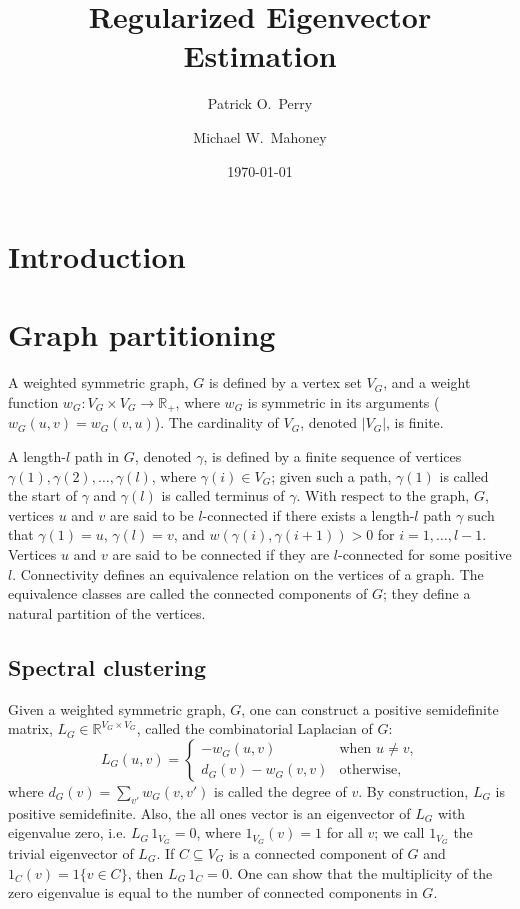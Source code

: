 \documentclass[12pt]{article}
\newcommand{\reals}{\mathbb{R}}
\theoremstyle{plain}
\begin{document}
\title{
  Regularized Eigenvector Estimation
}
\author{
  Patrick O.\ Perry
  \and
  Michael W.\ Mahoney
}
\date{
  \today
}
\maketitle

\begin{abstract}
\end{abstract}

\section{Introduction}

\section{Graph partitioning}
\label{S:introduction}

A weighted symmetric graph, $G$ is defined by a vertex set $V_G$, and a
weight function $w_G : V_G \times V_G \to \reals_+$, where $w_G$ is symmetric
in its arguments ($w_G(u,v) = w_G(v,u)$).  The cardinality of $V_G$,
denoted $|V_G|$, is finite.

A length-$l$ path in $G$, denoted $\gamma$, is defined by a finite sequence of
vertices $\gamma(1), \gamma(2), \ldots, \gamma(l)$, where $\gamma(i) \in V_G$; given
such a path, $\gamma(1)$ is called the start of $\gamma$ and 
$\gamma(l)$ is called terminus of $\gamma$.  With respect to
the graph, $G$, vertices $u$ and $v$ are said to be $l$-connected if there
exists a length-$l$ path $\gamma$ such that $\gamma(1) = u$,
$\gamma(l) = v$, and $w(\gamma(i), \gamma(i+1)) > 0$ for $i = 1,
\ldots, l-1$.  Vertices $u$ and $v$ are said to be connected if they
are $l$-connected for some positive $l$.  Connectivity defines an
equivalence relation on the vertices of a graph.  The equivalence
classes are called the connected components of $G$; they define a
natural partition of the vertices.

\subsection{Spectral clustering}

Given a weighted symmetric graph, $G$, one can construct a positive
semidefinite matrix, $L_G \in \reals^{V_G \times V_G}$, called the combinatorial Laplacian of $G$:
\[
  L_G(u,v)
  =
  \begin{cases}
    - w_G(u,v) & \text{when $u \neq v$,} \\
    d_G(v) - w_G(v,v) & \text{otherwise,}
  \end{cases}
\]
where $d_G(v) = \sum_{v'} w_G(v,v')$ is called the degree of $v$.
By construction, $L_G$ is positive semidefinite.  Also, the all ones
vector is an eigenvector of $L_G$ with eigenvalue zero, i.e. $L_G \, 1_{V_G}
= 0$, where $1_{V_G}(v) = 1$ for all $v$; we call $1_{V_G}$ the
trivial eigenvector of $L_G$.  If $C \subseteq V_G$ is a connected component of
$G$ and $1_C(v) = 1\{ v \in C \}$, then $L_G \, 1_C = 0$.  One can
show that the multiplicity of the zero eigenvalue is equal to the
number of connected components in $G$.
\end{document}

